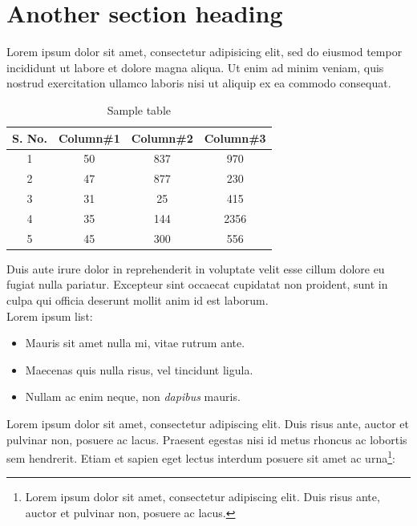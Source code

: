 \documentclass[a4paper,11pt,openany]{book}
\begin{document}
\section{Another section heading}
Lorem ipsum dolor sit amet, consectetur adipisicing elit, sed do eiusmod tempor incididunt ut labore et dolore magna aliqua. Ut enim ad minim veniam, quis nostrud exercitation ullamco laboris nisi ut aliquip ex ea commodo consequat.

\begin{table}[ht]
\caption{Sample table} %
\centering %
\begin{tabular}{c c c c}
\hline\hline %
S. No. & Column\#1 & Column\#2 & Column\#3 \\ [0.5ex]
\hline %
1 & 50 & 837 & 970 \\
2 & 47 & 877 & 230 \\
3 & 31 & 25 & 415 \\
4 & 35 & 144 & 2356 \\
5 & 45 & 300 & 556 \\ [1ex] %
\hline %
\end{tabular}
\label{table:nonlin} %
\end{table}

Duis aute irure dolor in reprehenderit in voluptate velit esse cillum dolore eu fugiat nulla pariatur. Excepteur sint occaecat cupidatat non proident, sunt in culpa qui officia deserunt mollit anim id est laborum. \\ Lorem ipsum list:
\begin{itemize}
\item Mauris sit amet nulla mi, vitae rutrum ante.
\item Maecenas quis nulla risus, vel tincidunt ligula.
\item Nullam ac enim neque, non \emph{dapibus} mauris.
\end{itemize}

\noindent Lorem ipsum dolor sit amet, consectetur adipiscing elit. Duis risus ante, auctor et pulvinar non, posuere ac lacus. Praesent egestas nisi id metus rhoncus ac lobortis sem hendrerit. Etiam et sapien eget lectus interdum posuere sit amet ac urna\footnote{Lorem ipsum dolor sit amet, consectetur adipiscing elit. Duis risus ante, auctor et pulvinar non, posuere ac lacus.}:
\end{document}
